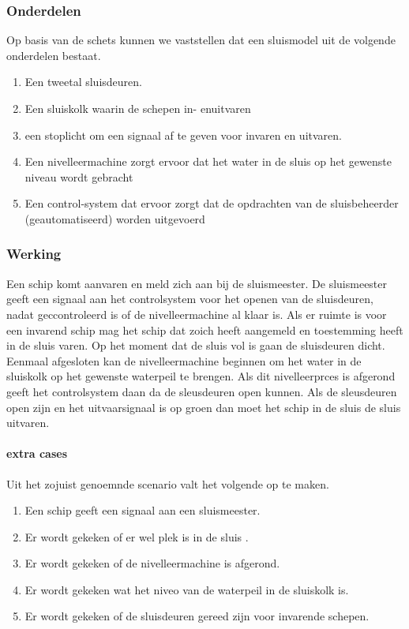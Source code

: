 \subsubsection{Onderdelen}
Op basis van de schets kunnen we vaststellen dat een sluismodel uit de volgende onderdelen bestaat.

\begin{enumerate}
\item Een tweetal sluisdeuren. 
\item Een sluiskolk waarin de schepen in- enuitvaren
\item een stoplicht om een signaal af te geven voor invaren en uitvaren.
\item Een nivelleermachine zorgt ervoor dat het water in de sluis op het gewenste niveau wordt gebracht
\item Een control-system dat ervoor zorgt dat de opdrachten van de sluisbeheerder (geautomatiseerd) worden uitgevoerd
\end{enumerate}
\subsubsection{Werking}

Een schip komt aanvaren en meld zich aan bij de sluismeester. De sluismeester geeft een signaal aan het controlsystem voor het openen van de sluisdeuren, nadat geccontroleerd is of de nivelleermachine al klaar is. Als er ruimte is voor een invarend schip mag het schip dat zoich heeft aangemeld en toestemming heeft  in de sluis varen. Op het moment dat de sluis vol is gaan de sluisdeuren dicht. Eenmaal afgesloten kan de nivelleermachine beginnen om het water in de sluiskolk op het gewenste waterpeil te brengen. Als dit nivelleerprces is afgerond geeft  het controlsystem daan da de sleusdeuren open kunnen.  Als de sleusdeuren open zijn en het uitvaarsignaal is op groen dan moet het schip in de sluis de sluis uitvaren.
\paragraph{extra cases}
Uit het zojuist genoemnde scenario valt het volgende op te maken.
\begin{enumerate}
\item Een schip geeft een signaal aan een sluismeester.
\item Er wordt gekeken of er wel plek is in de sluis .
\item Er wordt gekeken of de nivelleermachine is afgerond.
\item Er wordt gekeken wat het niveo van de waterpeil in de sluiskolk is.
\item Er wordt gekeken of de sluisdeuren gereed zijn voor invarende schepen.
\end{enumerate}
